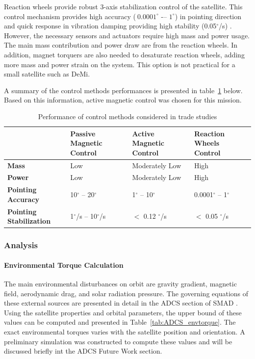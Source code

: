 \documentclass[12pt]{article}
\begin{document}
Reaction wheels provide robust 3-axis stabilization control of the satellite. This control mechanism provides high accuracy ($~ 0.0001^\circ$ -– $1^\circ$) in pointing direction and quick response in vibration damping providing high stability (0.05$^\circ$/s) \cite[p.~578]{SMAD}. However, the necessary sensors and actuators require high mass and power usage. The main mass contribution and power draw are from the reaction wheels. In addition, magnet torquers are also needed to desaturate reaction wheels, adding more mass and power strain on the system. This option is not practical for a small satellite such as DeMi. 

A summary of the control methods performances is presented in table~\ref{tab:ADCS_trade} below. Based on this information, active magnetic control was chosen for this mission. 

\begin{table}[htbp]
  \centering
  \caption{Performance of control methods considered in trade studies}
    \begin{tabular}{|p{4cm}|p{3cm}|p{3cm}|p{3cm}|}
    \hline
          & \textbf{Passive Magnetic Control} & \textbf{Active Magnetic Control} & \textbf{Reaction Wheels Control } \bigstrut\\
    \hline
    \textbf{Mass } & Low   & Moderately Low & High  \bigstrut\\
    \hline
    \textbf{Power} & Low   & Moderately Low & High \bigstrut\\
    \hline
    \textbf{Pointing  Accuracy} &  10$^\circ$ -- 20$^\circ$ &  1$^\circ$ -- 10$^\circ$ &  0.0001$^\circ$ -- 1$^\circ$ \bigstrut\\
    \hline
    \textbf{Pointing Stabilization} & 1$^\circ$/s  -- 10$^\circ$/s & $<$ 0.12 $^\circ$/s & $<$ 0.05 $^\circ$/s \bigstrut\\
    \hline
    \end{tabular}%
  \label{tab:ADCS_trade}%
\end{table}%





			\subsubsection{Analysis}
			\label{adcs_analysis}
				\paragraph{Environmental Torque Calculation}
				The main environmental disturbances on orbit are gravity gradient, magnetic field, aerodynamic drag, and solar radiation pressure. The governing equations of these external sources are presented in detail in the ADCS section of SMAD \cite[p.~570-573]{SMAD}. Using the satellite properties and orbital parameters, the upper bound of these values can be computed and presented in Table~\ref{tab:ADCS_envtorque}. The exact environmental torques varies with the satellite position and orientation. A preliminary simulation was constructed to compute these values and will be discussed briefly int the ADCS Future Work section.
\end{document}
